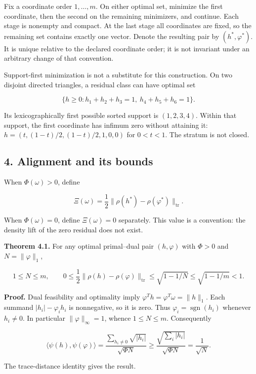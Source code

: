 \documentclass[
]{article}
\begin{document}
Fix a coordinate order \(1,\ldots,m\). On either optimal set, minimize
the first coordinate, then the second on the remaining minimizers, and
continue. Each stage is nonempty and compact. At the last stage all
coordinates are fixed, so the remaining set contains exactly one vector.
Denote the resulting pair by \((h^*,\varphi^*)\). It is unique relative
to the declared coordinate order; it is not invariant under an arbitrary
change of that convention.

Support-first minimization is not a substitute for this construction. On
two disjoint directed triangles, a residual class can have optimal set

\[
\{h\ge0:h_1+h_2+h_3=1,\ h_4+h_5+h_6=1\}.
\]

Its lexicographically first possible sorted support is \((1,2,3,4)\).
Within that support, the first coordinate has infimum zero without
attaining it: \(h=(t,(1-t)/2,(1-t)/2,1,0,0)\) for \(0<t<1\). The stratum
is not closed.

\subsection{4. Alignment and its bounds}\label{alignment-and-its-bounds}

When \(\Phi(\omega)>0\), define

\[
\Xi(\omega)=\frac12\|\rho(h^*)-\rho(\varphi^*)\|_{\mathrm{tr}}.
\]

When \(\Phi(\omega)=0\), define \(\Xi(\omega)=0\) separately. This value
is a convention: the density lift of the zero residual does not exist.

\textbf{Theorem 4.1.} For any optimal primal--dual pair \((h,\varphi)\)
with \(\Phi>0\) and \(N=\|\varphi\|_1\),

\[
1\le N\le m,\qquad
0\le\frac12\|\rho(h)-\rho(\varphi)\|_{\mathrm{tr}}
\le\sqrt{1-1/N}\le\sqrt{1-1/m}<1.
\]

\textbf{Proof.} Dual feasibility and optimality imply
\(\varphi^Th=\varphi^T\omega=\|h\|_1\). Each summand
\(|h_i|-\varphi_i h_i\) is nonnegative, so it is zero. Thus
\(\varphi_i=\operatorname{sgn}(h_i)\) whenever \(h_i\ne0\). In
particular \(\|\varphi\|_\infty=1\), whence \(1\le N\le m\).
Consequently

\[
\langle\psi(h),\psi(\varphi)\rangle
=\frac{\sum_{h_i\ne0}\sqrt{|h_i|}}{\sqrt{\Phi N}}
\ge\frac{\sqrt{\sum_i|h_i|}}{\sqrt{\Phi N}}
=\frac1{\sqrt N}.
\]

The trace-distance identity gives the result.
\end{document}
